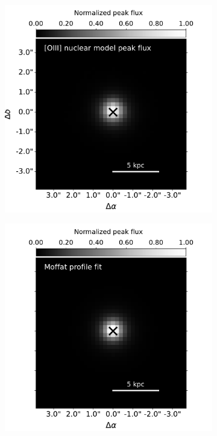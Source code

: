 \begin{figure}[!t]
    \begin{subfigure}[t]{0.3355\linewidth}
        \centering
        \includegraphics[width=\textwidth, trim={0 0 1.5cm 0}, clip]{figures/muse_f13451_1232/nuclear_model_psf.pdf}
    \end{subfigure}
    \hspace*{\fill}
    \begin{subfigure}[t]{0.3\linewidth}
        \centering
        \includegraphics[width=\textwidth, trim={2cm 0 1.5cm 0}, clip]{figures/muse_f13451_1232/nuclear_model_psf_model.pdf}

\end{subfigure}
\end{figure}
